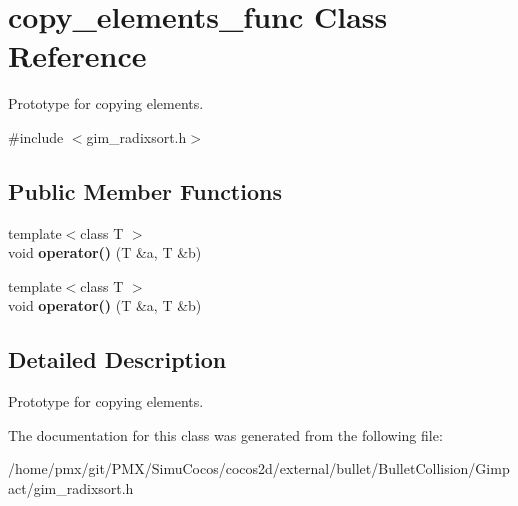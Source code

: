 \hypertarget{classcopy__elements__func}{}\section{copy\+\_\+elements\+\_\+func Class Reference}
\label{classcopy__elements__func}


Prototype for copying elements.  




{\ttfamily \#include $<$gim\+\_\+radixsort.\+h$>$}

\subsection*{Public Member Functions}
\begin{DoxyCompactItemize}
\item 
\mbox{\label{classcopy__elements__func_abbcb17956cf9db4e3d9aff17ca2aedcd}} 
{\footnotesize template$<$class T $>$ }\\void {\bfseries operator()} (T \&a, T \&b)
\item 
\mbox{\label{classcopy__elements__func_abbcb17956cf9db4e3d9aff17ca2aedcd}} 
{\footnotesize template$<$class T $>$ }\\void {\bfseries operator()} (T \&a, T \&b)
\end{DoxyCompactItemize}


\subsection{Detailed Description}
Prototype for copying elements. 

The documentation for this class was generated from the following file\+:\begin{DoxyCompactItemize}
\item 
/home/pmx/git/\+P\+M\+X/\+Simu\+Cocos/cocos2d/external/bullet/\+Bullet\+Collision/\+Gimpact/gim\+\_\+radixsort.\+h\end{DoxyCompactItemize}
